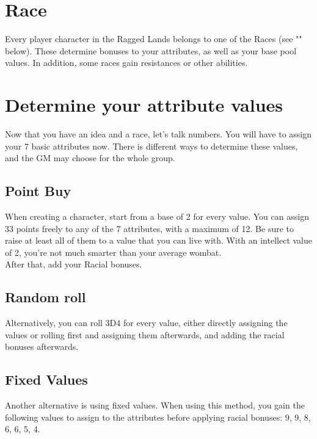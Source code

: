 \section{Race}\label{sec:charCreationRace}

Every player character in the Ragged Lands belongs to one of the Races (see "" below).
These determine bonuses to your attributes, as well as your base pool values. 
In addition, some races gain resistances or other abilities.


\section{Determine your attribute values}\label{sec:determineAttributes}

Now that you have an idea and a race, let's talk numbers.
You will have to assign your 7 basic attributes now.
There is different ways to determine these values, and the GM may choose for the whole group.


\subsection{Point Buy}\label{subsec:pointBuy}

When creating a character, start from a base of 2 for every value.
You can assign 33 points freely to any of the 7 attributes, with a maximum of 12.
Be sure to raise at least all of them to a value that you can live with.
With an intellect value of 2, you're not much smarter than your average wombat.\\
After that, add your Racial bonuses.



\subsection{Random roll}\label{subsec:pointRoll}

Alternatively, you can roll 3D4 for every value, either directly assigning the values or rolling first and assigning them afterwards, and adding the racial bonuses afterwards. 


\subsection{Fixed Values}\label{subsec:pointFixed}

Another alternative is using fixed values.
When using this method, you gain the following values to assign to the attributes before applying racial bonuses: 9, 9, 8, 6, 6, 5, 4.



